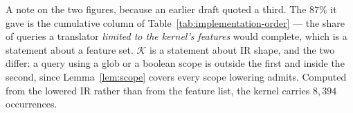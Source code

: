 \begin{remark}\label{rem:kernel-figures}
A note on the two figures, because an earlier draft quoted a third. The $87\%$ it gave
is the cumulative column of Table~\ref{tab:implementation-order} --- the share of queries
a translator \emph{limited to the kernel's features} would complete, which is a
statement about a feature set. $\mathcal{K}$ is a statement about IR shape, and the two
differ: a query using a glob or a boolean scope is outside the first and inside the
second, since Lemma~\ref{lem:scope} covers every scope lowering admits. Computed from
the lowered IR rather than from the feature list, the kernel carries $8{,}394$
occurrences.
\end{remark}
